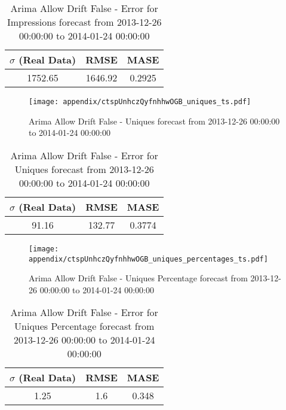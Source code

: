 \begin{table}[H]
\centering
\footnotesize
\begin{tabular}{ccc}
$\sigma$ (Real Data) & RMSE & MASE   \\ \hline
1752.65 & 1646.92 & 0.2925 \\
\end{tabular}

\vspace{0.5cm}

\caption{
Arima Allow Drift False - Error for Impressions forecast from 2013-12-26 00:00:00 to 2014-01-24 00:00:00}
\end{table}

\begin{figure}[H] \begin{center} \leavevmode
\texttt{[image: appendix/ctspUnhczQyfnhhwOGB\_uniques\_ts.pdf]} \caption{
Arima Allow Drift False - Uniques forecast from 2013-12-26 00:00:00 to 2014-01-24 00:00:00} \label{fig:appendix/ctspUnhczQyfnhhwOGB_uniques_ts.pdf} \end{center}
\end{figure}

\begin{table}[H]
\centering
\footnotesize
\begin{tabular}{ccc}
$\sigma$ (Real Data) & RMSE & MASE   \\ \hline
91.16 & 132.77 & 0.3774 \\
\end{tabular}

\vspace{0.5cm}

\caption{
Arima Allow Drift False - Error for Uniques forecast from 2013-12-26 00:00:00 to 2014-01-24 00:00:00}
\end{table}

\begin{figure}[H] \begin{center} \leavevmode
\texttt{[image: appendix/ctspUnhczQyfnhhwOGB\_uniques\_percentages\_ts.pdf]} \caption{
Arima Allow Drift False - Uniques Percentage forecast from 2013-12-26 00:00:00 to 2014-01-24 00:00:00} \label{fig:appendix/ctspUnhczQyfnhhwOGB_uniques_percentages_ts.pdf} \end{center}
\end{figure}

\begin{table}[H]
\centering
\footnotesize
\begin{tabular}{ccc}
$\sigma$ (Real Data) & RMSE & MASE   \\ \hline
1.25 & 1.6 & 0.348 \\
\end{tabular}

\vspace{0.5cm}

\caption{
Arima Allow Drift False - Error for Uniques Percentage forecast from 2013-12-26 00:00:00 to 2014-01-24 00:00:00}
\end{table}

